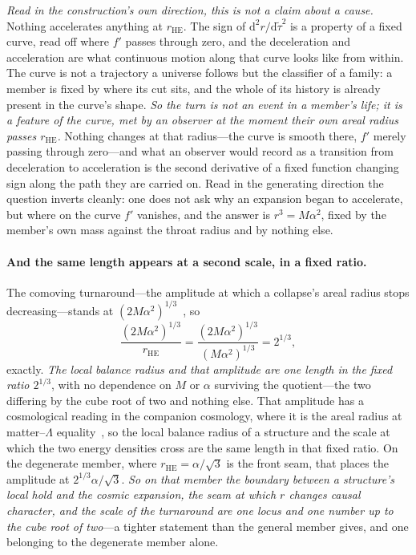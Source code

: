 \documentclass[11pt,a4paper]{article}
\theoremstyle{definition}
\newcommand{\dd}{\mathrm{d}}   %
\begin{document}
\emph{Read in the construction's own direction, this is not a claim about a cause.} Nothing accelerates anything at $r_{\mathrm{HE}}$. The sign of $\dd^{2}r/\dd\tilde\tau^{2}$ is a property of a fixed curve, read off where $f'$ passes through zero, and the deceleration and acceleration are what continuous motion along that curve looks like from within. The curve is not a trajectory a universe follows but the classifier of a family: a member is fixed by where its cut sits, and the whole of its history is already present in the curve's shape. \emph{So the turn is not an event in a member's life; it is a feature of the curve, met by an observer at the moment their own areal radius passes $r_{\mathrm{HE}}$.} Nothing changes at that radius---the curve is smooth there, $f'$ merely passing through zero---and what an observer would record as a transition from deceleration to acceleration is the second derivative of a fixed function changing sign along the path they are carried on. Read in the generating direction the question inverts cleanly: one does not ask why an expansion began to accelerate, but where on the curve $f'$ vanishes, and the answer is $r^{3}=M\alpha^{2}$, fixed by the member's own mass against the throat radius and by nothing else.

\paragraph{And the same length appears at a second scale, in a fixed ratio.} The comoving turnaround---the amplitude at which a collapse's areal radius stops decreasing---stands at $(2M\alpha^{2})^{1/3}$~\cite{JanzenCRframework}, so
\begin{equation}\label{eq:cuberoot2}
  \frac{(2M\alpha^{2})^{1/3}}{r_{\mathrm{HE}}}=\frac{(2M\alpha^{2})^{1/3}}{(M\alpha^{2})^{1/3}}=2^{1/3},
\end{equation}
exactly. \emph{The local balance radius and that amplitude are one length in the fixed ratio $2^{1/3}$}, with no dependence on $M$ or $\alpha$ surviving the quotient---the two differing by the cube root of two and nothing else. That amplitude has a cosmological reading in the companion cosmology, where it is the areal radius at matter--$\Lambda$ equality~\cite{JanzenCRcosmology}, so the local balance radius of a structure and the scale at which the two energy densities cross are the same length in that fixed ratio. On the degenerate member, where $r_{\mathrm{HE}}=\alpha/\sqrt3$ is the front seam, that places the amplitude at $2^{1/3}\alpha/\sqrt3$. \emph{So on that member the boundary between a structure's local hold and the cosmic expansion, the seam at which $r$ changes causal character, and the scale of the turnaround are one locus and one number up to the cube root of two}---a tighter statement than the general member gives, and one belonging to the degenerate member alone.
\end{document}
